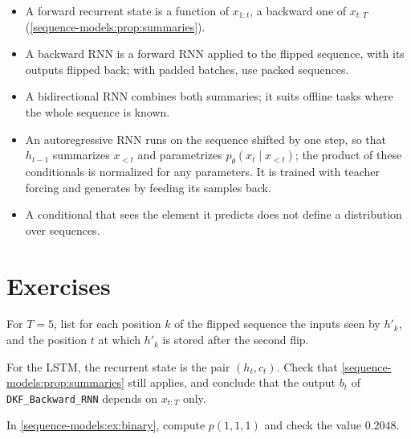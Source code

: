 \begin{notechapter}
\begin{chaptersummary}
\begin{itemize}
  \item A forward recurrent state is a function of $x_{1:t}$, a backward one of $x_{t:T}$
        (\cref{sequence-models:prop:summaries}).
  \item A backward RNN is a forward RNN applied to the flipped sequence, with its outputs flipped
        back; with padded batches, use packed sequences.
  \item A bidirectional RNN combines both summaries; it suits offline tasks where the whole
        sequence is known.
  \item An autoregressive RNN runs on the sequence shifted by one step, so that $h_{t-1}$ summarizes $x_{<t}$
        and parametrizes $p_\theta(x_t\mid x_{<t})$; the product of these conditionals is normalized for any
        parameters. It is trained with teacher forcing and generates by feeding its samples
        back.
  \item A conditional that sees the element it predicts does not define a distribution over
        sequences.
\end{itemize}
\end{chaptersummary}

\section*{Exercises}

\begin{exercise}\label{sequence-models:exr:1}
For $T = 5$, list for each position $k$ of the flipped sequence the inputs seen by $h'_k$, and the
position $t$ at which $h'_k$ is stored after the second flip.
\end{exercise}

\begin{exercise}\label{sequence-models:exr:2}
For the LSTM, the recurrent state is the pair $(h_t, c_t)$. Check that \cref{sequence-models:prop:summaries} still
applies, and conclude that the output $b_t$ of \texttt{DKF\_Backward\_RNN} depends on $x_{t:T}$ only.
\end{exercise}

\begin{exercise}\label{sequence-models:exr:3}
In \cref{sequence-models:ex:binary}, compute $p(1, 1, 1)$ and check the value $0.2048$.
\end{exercise}


\end{notechapter}
